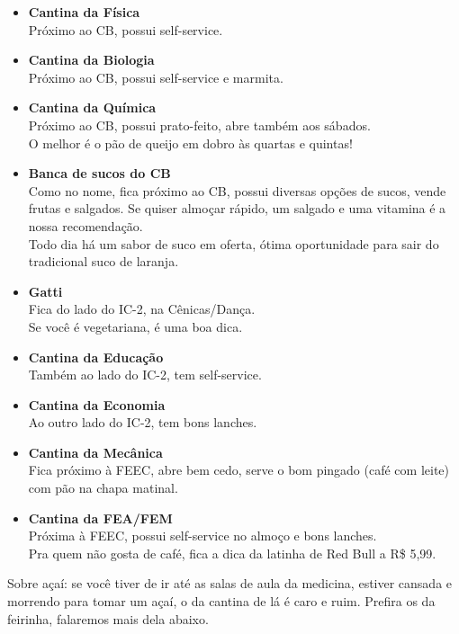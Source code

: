 \begin{itemize}
\item \textbf{Cantina da Física}
  \\Próximo ao CB, possui self-service.

\item \textbf{Cantina da Biologia}
  \\Próximo ao CB, possui self-service e marmita.

\item \textbf{Cantina da Química}
  \\Próximo ao CB, possui prato-feito, abre também aos sábados.
  \\O melhor é o pão de queijo em dobro às quartas e quintas!

\item \textbf{Banca de sucos do CB}
  \\Como no nome, fica próximo ao CB, possui diversas opções de sucos, vende
  frutas e salgados. Se quiser almoçar rápido, um salgado e uma vitamina é a
  nossa recomendação.
  \\Todo dia há um sabor de suco em oferta, ótima oportunidade para sair do
  tradicional suco de laranja.

\item \textbf{Gatti}
  \\Fica do lado do IC-2, na Cênicas/Dança.
  \\Se você é vegetariana, é uma boa dica.

\item \textbf{Cantina da Educação}
  \\Também ao lado do IC-2, tem self-service.

\item \textbf{Cantina da Economia}
  \\Ao outro lado do IC-2, tem bons lanches.

\item \textbf{Cantina da Mecânica}
  \\Fica próximo à FEEC, abre bem cedo, serve o bom pingado (café com leite)
  com pão na chapa matinal.

\item \textbf{Cantina da FEA/FEM}
  \\Próxima à FEEC, possui self-service no almoço e bons lanches.
  \\Pra quem não gosta de café, fica a dica da latinha de Red Bull a R\$ 5,99.
\end{itemize}

Sobre açaí: se você tiver de ir até as salas de aula da medicina, estiver
cansada e morrendo para tomar um açaí, o da cantina de lá é caro e ruim.
Prefira os da feirinha, falaremos mais dela abaixo.

